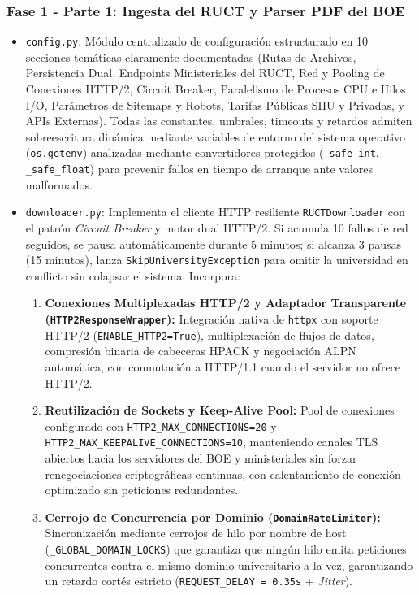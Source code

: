 \subsubsection{Fase 1 - Parte 1: Ingesta del RUCT y Parser PDF del BOE}
\begin{itemize}
    \item \texttt{config.py}: Módulo centralizado de configuración estructurado en 10 secciones temáticas claramente documentadas (Rutas de Archivos, Persistencia Dual, Endpoints Ministeriales del RUCT, Red y Pooling de Conexiones HTTP/2, Circuit Breaker, Paralelismo de Procesos CPU e Hilos I/O, Parámetros de Sitemaps y Robots, Tarifas Públicas SIIU y Privadas, y APIs Externas). Todas las constantes, umbrales, timeouts y retardos admiten sobreescritura dinámica mediante variables de entorno del sistema operativo (\texttt{os.getenv}) analizadas mediante convertidores protegidos (\texttt{\_safe\_int}, \texttt{\_safe\_float}) para prevenir fallos en tiempo de arranque ante valores malformados.
    \item \texttt{downloader.py}: Implementa el cliente HTTP resiliente \texttt{RUCTDownloader} con el patrón \emph{Circuit Breaker} y motor dual HTTP/2. Si acumula 10 fallos de red seguidos, se pausa automáticamente durante 5 minutos; si alcanza 3 pausas (15 minutos), lanza \texttt{SkipUniversityException} para omitir la universidad en conflicto sin colapsar el sistema. Incorpora:
    \begin{enumerate}
        \item \textbf{Conexiones Multiplexadas HTTP/2 y Adaptador Transparente (\texttt{HTTP2ResponseWrapper}):} Integración nativa de \texttt{httpx} con soporte HTTP/2 (\texttt{ENABLE\_HTTP2=True}), multiplexación de flujos de datos, compresión binaria de cabeceras HPACK y negociación ALPN automática, con conmutación a HTTP/1.1 cuando el servidor no ofrece HTTP/2.
        \item \textbf{Reutilización de Sockets y Keep-Alive Pool:} Pool de conexiones configurado con \texttt{HTTP2\_MAX\_CONNECTIONS=20} y \texttt{HTTP2\_MAX\_KEEPALIVE\_CONNECTIONS=10}, manteniendo canales TLS abiertos hacia los servidores del BOE y ministeriales sin forzar renegociaciones criptográficas continuas, con calentamiento de conexión optimizado sin peticiones redundantes.
        \item \textbf{Cerrojo de Concurrencia por Dominio (\texttt{DomainRateLimiter}):} Sincronización mediante cerrojos de hilo por nombre de host (\texttt{\_GLOBAL\_DOMAIN\_LOCKS}) que garantiza que ningún hilo emita peticiones concurrentes contra el mismo dominio universitario a la vez, garantizando un retardo cortés estricto (\texttt{REQUEST\_DELAY = 0.35s} + \emph{Jitter}).

\end{enumerate}
\end{itemize}
